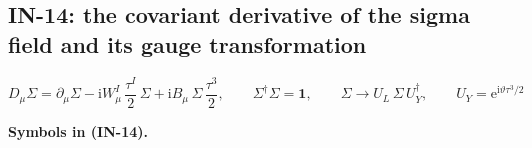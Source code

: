 \documentclass[
  10pt,
]{article}
\begin{document}
\hypertarget{in-14-the-covariant-derivative-of-the-sigma-field-and-its-gauge-transformation}{%
\subsection{IN-14: the covariant derivative of the sigma field and its
gauge
transformation}\label{in-14-the-covariant-derivative-of-the-sigma-field-and-its-gauge-transformation}}

\[
D_\mu\Sigma = \partial_\mu\Sigma - \mathrm{i}W^I_\mu\,\frac{\tau^I}{2}\,\Sigma +
 \mathrm{i}B_\mu\,\Sigma\,\frac{\tau^3}{2},\qquad
\Sigma^\dagger\Sigma = \mathbf{1},\qquad \Sigma \to U_L\,\Sigma\,U_Y^\dagger,\qquad
U_Y = \mathrm{e}^{\mathrm{i}\vartheta\tau^3/2} \tag{IN-14}
\]

\textbf{Symbols in (IN-14).}
\end{document}
